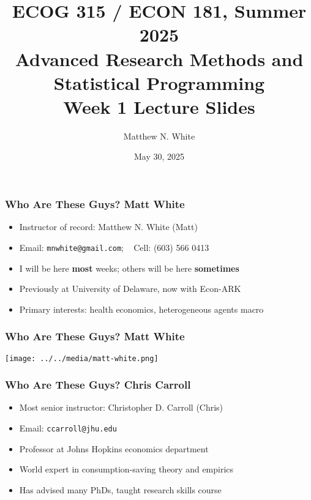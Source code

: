 \documentclass[aspectratio=169]{beamer}
\author{Matthew N. White}
\title[add]{ECOG 315 / ECON 181, Summer 2025 \\ Advanced Research Methods and Statistical Programming \\ Week 1 Lecture Slides}
\institute[HU]{Howard University}
\date{May 30, 2025}
\begin{document}
\begin{frame}
\maketitle
\end{frame}


\begin{frame}
\frametitle{Who Are These Guys? Matt White}
\begin{itemize}
	\item Instructor of record: Matthew N. White (Matt)
	
	\item Email: \texttt{mnwhite@gmail.com}; ~ Cell: (603) 566 0413
	
	\item I will be here \textbf{most} weeks; others will be here \textbf{sometimes}
	
	\item Previously at University of Delaware, now with Econ-ARK
	
	\item Primary interests: health economics, heterogeneous agents macro
\end{itemize}
\end{frame}

\begin{frame}
\frametitle{Who Are These Guys? Matt White}
\centering
\texttt{[image: ../../media/matt-white.png]}
\end{frame}

\begin{frame}
\frametitle{Who Are These Guys? Chris Carroll}
\begin{itemize}
	\item Most senior instructor: Christopher D. Carroll (Chris)
	
	\item Email: \texttt{ccarroll@jhu.edu}
	
	\item Professor at Johns Hopkins economics department
	
	\item World expert in consumption-saving theory and empirics
	
	\item Has advised many PhDs, taught research skills course
\end{itemize}
\end{frame}
\end{document}
